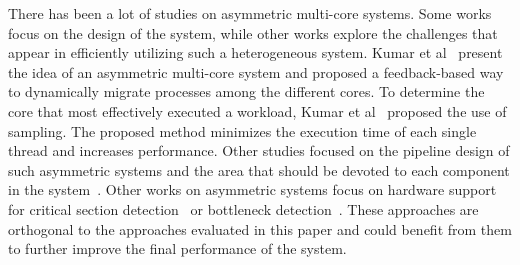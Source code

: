 \iffalse
\mm{I don't think we have to focus so much in schedulers. I would also add other things, like HW support, runtime extensions, or application modifications for heterogeneous systems.}

\mm{Missing refs: the CATS ICS 2015~\cite{Chronaki:ICS2015}, all OmpSs support for GPU+CPU systems and other heterogeneous platforms~\cite{Bueno:IPDPS2012,Planas:IPDPS2013,Planas:ICCS2015}.} 

\mm{Also missing all the papers from Onur Mutlu on Asymmetric Multicores}

\mm{Maybe we can include some performance characterization of real machines. At BSC, we have a good paper track on this: POWER5 decode priorities (ISCA 2005), POWER7 prefetcher (PACT), UltraSPARC T1 (MICRO, Petar), etc.}
\fi



There has been a lot of studies on asymmetric multi-core systems. Some works focus on the design of the system, while other works explore the challenges that appear in efficiently utilizing such a heterogeneous system.
Kumar et al~\cite{Kumar_micro_2003} present the idea of an asymmetric multi-core system and proposed a feedback-based way to dynamically migrate processes among the different cores. 
To determine the core that most effectively executed a workload, Kumar et al~\cite{Kumar:ISCA2004} proposed the use of sampling. The proposed method minimizes the execution time of each single thread and increases performance. Other studies focused on the pipeline design of such asymmetric systems and the area that should be devoted to each component in the system~\cite{Balakrishnan:ISCA2005, Morad_area_based}. Other works on asymmetric systems focus on hardware support for critical section detection~\cite{Suleman:APLOS2009} or bottleneck detection~\cite{Joao:ASPLOS2012,Joao:ISCA2013}.
These approaches are orthogonal to the approaches evaluated in this paper and could benefit from them to further improve the final performance of the system.

